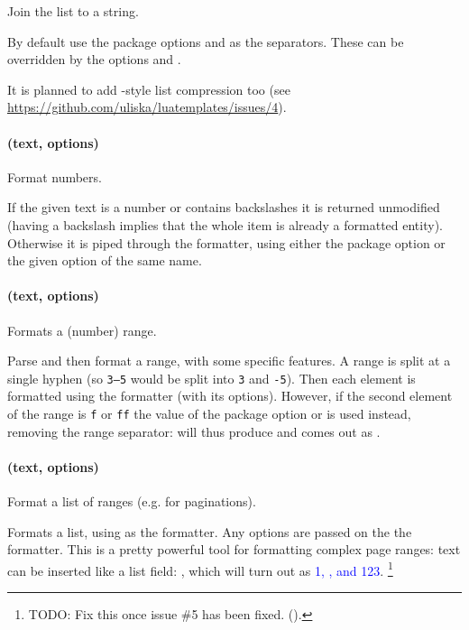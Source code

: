 \documentclass{scrartcl}
\begin{document}
Join the list to a string.

By default use the package options  and 
as the separators. These can be overridden  by the options 
and .

It is planned to add -style list compression too (see
\url{https://github.com/uliska/luatemplates/issues/4}).


\paragraph{ (text, options)}

Format numbers.

If the given text is a number or contains backslashes it is returned unmodified
(having a backslash implies that the whole item is already a formatted
entity). Otherwise it is piped through the  formatter, using either
the package option  or the given option of the same name.


\paragraph{ (text, options)}

Formats a (number) range.

Parse and then format a range, with some specific features.  A range is split at
a single hyphen (so \texttt{3--5} would be split into \texttt{3} and
\texttt{-5}).  Then each element is formatted using the 
formatter (with its options).  However, if the second element of the range is
\texttt{f} or \texttt{ff} the value of the package option 
or  is used instead, removing the range separator:
\texttt{} will thus produce  and
\texttt{} comes out as
.


\paragraph{ (text, options)}

Format a list of ranges (e.g. for paginations).

Formats a list, using  as the formatter.  Any options are passed
on the the  formatter.  This is a pretty powerful tool for
formatting complex page ranges: text can be inserted like a 
list field: \texttt{}, which will turn out as \textcolor{blue}{1, ,  and 123}.%
\footnote{TODO: Fix this once issue \#5 has been fixed. ().}
\end{document}
